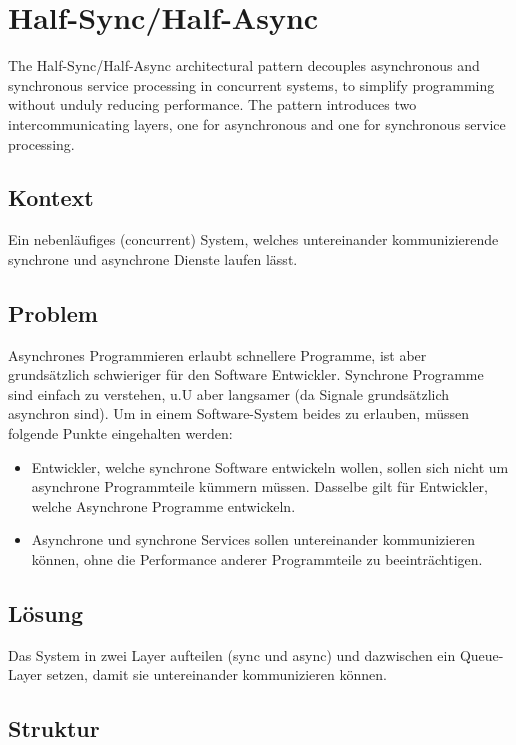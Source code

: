 \section{Half-Sync/Half-Async}

The Half-Sync/Half-Async architectural pattern decouples asynchronous and synchronous service processing in concurrent systems, to simplify programming without unduly reducing performance. The pattern introduces two intercommunicating layers, one for asynchronous and one for synchronous service processing.

\subsection{Kontext}

Ein nebenläufiges (concurrent) System, welches untereinander kommunizierende synchrone und asynchrone Dienste laufen lässt.

\subsection{Problem}

Asynchrones Programmieren erlaubt schnellere Programme, ist aber grundsätzlich schwieriger für den Software Entwickler.
Synchrone Programme sind einfach zu verstehen, u.U aber langsamer (da Signale grundsätzlich asynchron sind).
Um in einem Software-System beides zu erlauben, müssen folgende Punkte eingehalten werden:

\begin{itemize}
	\item Entwickler, welche synchrone Software entwickeln wollen, sollen sich nicht um asynchrone Programmteile kümmern müssen. Dasselbe gilt für Entwickler, welche Asynchrone Programme entwickeln.
	\item Asynchrone und synchrone Services sollen untereinander kommunizieren können, ohne die Performance anderer Programmteile zu beeinträchtigen.
\end{itemize}

\subsection{Lösung}

Das System in zwei Layer aufteilen (sync und async) und dazwischen ein Queue-Layer setzen, damit sie untereinander kommunizieren können.

\subsection{Struktur}

